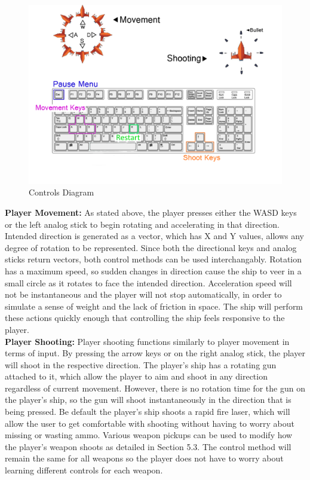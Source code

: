 \documentclass[12pt]{article}       %
\begin{document}
\begin{figure} [H]
\centering
\includegraphics[width=6.3 in]{ControlDiagramFinal.png}
\caption{Controls Diagram} \label{Controls}
\end{figure}

	{\bf Player Movement:}	As stated above, the player presses either the WASD keys or the left analog stick to begin rotating and accelerating in that direction. Intended direction is generated as a vector, which has X and Y values, allows any degree of rotation to be represented. Since both the directional keys and analog sticks return vectors, both control methods can be used interchangably. Rotation has a maximum speed, so sudden changes in direction cause the ship to veer in a small circle as it rotates to face the intended direction. Acceleration speed will not be instantaneous and the player will not stop automatically, in order to simulate a sense of weight and the lack of friction in space. The ship will perform these actions quickly enough that controlling the ship feels responsive to the player. \\

	{\bf Player Shooting:} Player shooting functions similarly to player movement in terms of input. By pressing the arrow keys or on the right analog stick, the player will shoot in the respective direction. The player's ship has a rotating gun attached to it, which allow the player to aim and shoot in any direction regardless of current movement. However, there is no rotation time for the gun on the player's ship, so the gun will shoot instantaneously in the direction that is being pressed. Be default the player's ship shoots a rapid fire laser, which will allow the user to get comfortable with shooting without having to worry about missing or wasting ammo. Various weapon pickups can be used to modify how the player's weapon shoots as detailed in Section 5.3. The control method will remain the same for all weapons so the player does not have to worry about learning different controls for each weapon. \\
\end{document}
